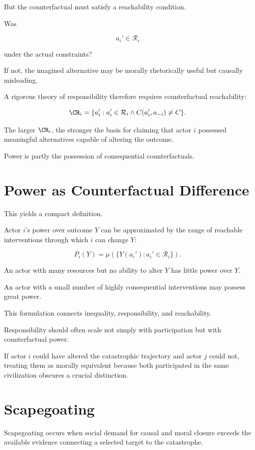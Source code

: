 \documentclass[11pt,oneside]{book}
\theoremstyle{definition}
\theoremstyle{remark}
\newcommand{\R}{\mathcal{R}}
\begin{document}
But the counterfactual must satisfy a reachability condition.

Was

\[
a_i'\in\R_i
\]

under the actual constraints?

If not, the imagined alternative may be morally rhetorically useful but causally misleading.

A rigorous theory of responsibility therefore requires counterfactual reachability:

\[
\CR_i
=
\{
a_i':
a_i'\in\R_i
\land
C(a_i',a_{-i})\neq C
\}.
\]

The larger \(\CR_i\), the stronger the basis for claiming that actor \(i\) possessed meaningful alternatives capable of altering the outcome.

Power is partly the possession of consequential counterfactuals.

\section{Power as Counterfactual Difference}

This yields a compact definition.

Actor \(i\)'s power over outcome \(Y\) can be approximated by the range of reachable interventions through which \(i\) can change \(Y\):

\[
P_i(Y)
=
\mu
\left(
\{
Y(a_i'):
a_i'\in\R_i
\}
\right).
\]

An actor with many resources but no ability to alter \(Y\) has little power over \(Y\).

An actor with a small number of highly consequential interventions may possess great power.

This formulation connects inequality, responsibility, and reachability.

Responsibility should often scale not simply with participation but with counterfactual power.

If actor \(i\) could have altered the catastrophic trajectory and actor \(j\) could not, treating them as morally equivalent because both participated in the same civilization obscures a crucial distinction.

\section{Scapegoating}

Scapegoating occurs when social demand for causal and moral closure exceeds the available evidence connecting a selected target to the catastrophe.
\end{document}
